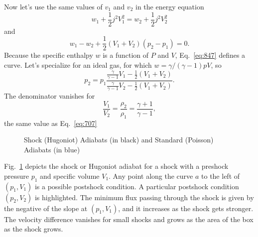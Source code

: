 Now let's use the same values of $v_1$ and $v_2$ in the energy
equation
\begin{equation}
  \label{eq:846}
  w_1 + \frac{1}{2} j^2 V_1^2 = w_2 + \frac{1}{2} j^2 V_2^2
\end{equation}
and
\begin{equation}
  \label{eq:847}
  w_1 - w_2 + \frac{1}{2} \left ( V_1 + V_2 \right ) \left ( p_2 - p_1
  \right ) = 0.
\end{equation}
Because the specific enthalpy $w$ is a function of $P$ and $V$,
Eq.~\ref{eq:847} defines a curve.  Let's specialize for an ideal gas,
for which $w = \gamma/(\gamma - 1) p V$, so 
\begin{equation}
p_2 = p_1 \frac{\frac{\gamma}{\gamma-1} V_1 - \frac{1}{2} \left ( V_1
    + V_2 \right ) }{\frac{\gamma}{\gamma-1} V_2 - \frac{1}{2} \left ( V_1
    + V_2 \right ) }.
\label{eq:851}
\end{equation}
The denominator vanishes for 
\begin{equation}
\frac{V_1}{V_2} = \frac{\rho_2}{\rho_1} = \frac{\gamma+1}{\gamma-1},
\label{eq:852}
\end{equation}
the same value as Eq.~\ref{eq:707}
\begin{figure}
\begin{center}
\end{center}
\caption{Shock (Hugoniot) Adiabats (in black) and Standard (Poisson)
  Adiabats (in blue)}
\label{fig:Hugoniot}
\end{figure}
Fig.~\ref{fig:Hugoniot} depicts the shock or Hugoniot adiabat for a
shock with a preshock pressure $p_1$ and specific volume $V_1$.  Any
point along the curve $a$ to the left of $(p_1,V_1)$ is a possible
postshock condition.  A particular postshock condition $(p_2,V_2)$ is
highlighted. The minimum flux passing through the shock is
given by the negative of the slope at $(p_1,V_1)$, and it increases as
the shock gets stronger.  The velocity difference vanishes for small
shocks and grows as the area of the box as the shock grows.  

